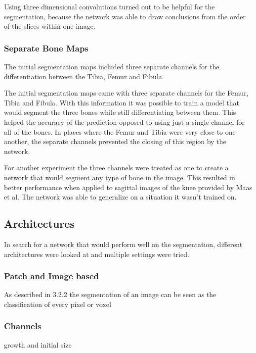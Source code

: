 Using three dimensional convolutions turned out to be helpful for the segmentation, because the network was able to draw conclusions from the order of the slices within one image. 

\subsubsection{Separate Bone Maps}

The initial segmentation maps included three separate channels for the differentiation between the Tibia, Femur and Fibula. 

The initial segmentation maps came with three separate channels for the Femur, Tibia and Fibula. With this information it was possible to train a model that would segment the three bones while still differentiating between them. This helped the accuracy of the prediction opposed to using just a single channel for all of the bones. In places where the Femur and Tibia were very close to one another, the separate channels prevented the closing of this region by the network.

For another experiment the three channels were treated as one to create a network that would segment any type of bone in the image. This resulted in better performance when applied to sagittal images of the knee provided by Maas et al. The network was able to generalize on a situation it wasn't trained on.

\subsection{Architectures}



In search for a network that would perform well on the segmentation, different architectures were looked at and multiple settings were tried.

\subsubsection{Patch and Image based}

As described in 3.2.2 the segmentation of an image can be seen as the classification of every pixel or voxel


\subsubsection{Channels}

growth and initial size

